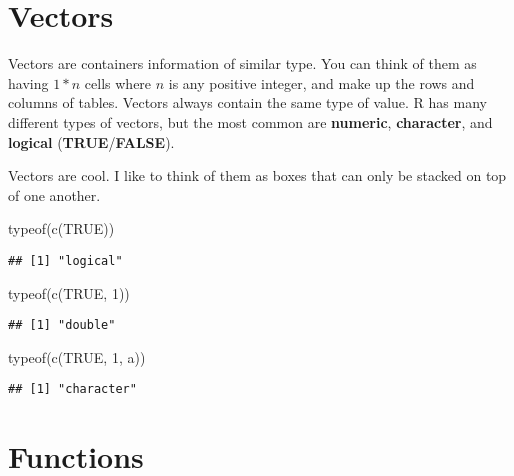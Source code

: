 \documentclass[
]{book}
\newenvironment{Shaded}{\begin{snugshade}}{\end{snugshade}}
\newcommand{\ConstantTok}[1]{\textcolor[rgb]{0.00,0.00,0.00}{#1}}
\newcommand{\DecValTok}[1]{\textcolor[rgb]{0.00,0.00,0.81}{#1}}
\newcommand{\FunctionTok}[1]{\textcolor[rgb]{0.00,0.00,0.00}{#1}}
\newcommand{\NormalTok}[1]{#1}
\newcommand{\StringTok}[1]{\textcolor[rgb]{0.31,0.60,0.02}{#1}}
\begin{document}
\hypertarget{vectors}{%
\section{Vectors}\label{vectors}}

Vectors are containers information of similar type. You can think of them as having \(1*n\) cells where \(n\) is any positive integer, and make up the rows and columns of tables. Vectors always contain the same type of value. R has many different types of vectors, but the most common are \textbf{numeric}, \textbf{character}, and \textbf{logical} (\textbf{TRUE}/\textbf{FALSE}).

Vectors are cool. I like to think of them as boxes that can only be stacked on top of one another.

\begin{Shaded}
\begin{Highlighting}[]
\FunctionTok{typeof}\NormalTok{(}\FunctionTok{c}\NormalTok{(}\ConstantTok{TRUE}\NormalTok{))}
\end{Highlighting}
\end{Shaded}

\begin{verbatim}
## [1] "logical"
\end{verbatim}

\begin{Shaded}
\begin{Highlighting}[]
\FunctionTok{typeof}\NormalTok{(}\FunctionTok{c}\NormalTok{(}\ConstantTok{TRUE}\NormalTok{, }\DecValTok{1}\NormalTok{))}
\end{Highlighting}
\end{Shaded}

\begin{verbatim}
## [1] "double"
\end{verbatim}

\begin{Shaded}
\begin{Highlighting}[]
\FunctionTok{typeof}\NormalTok{(}\FunctionTok{c}\NormalTok{(}\ConstantTok{TRUE}\NormalTok{, }\DecValTok{1}\NormalTok{, }\StringTok{\textquotesingle{}a\textquotesingle{}}\NormalTok{))}
\end{Highlighting}
\end{Shaded}

\begin{verbatim}
## [1] "character"
\end{verbatim}

\hypertarget{functions-1}{%
\section{Functions}\label{functions-1}}
\end{document}
